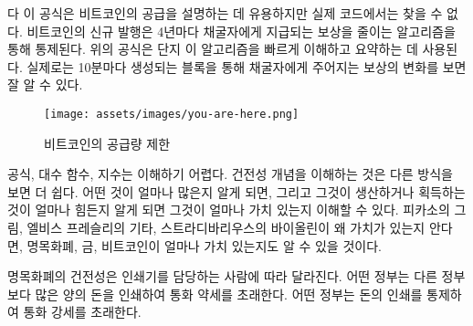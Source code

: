 \begin{comment}	
While this formula is useful to describe Bitcoin's supply, it is actually
nowhere to be found in the code. Issuance of new bitcoin is done in an
algorithmically controlled fashion, by reducing the reward which is paid to
miners every four years~\cite{btcwiki:supply}. The formula above is used to
quickly sum up what is happening under the hood. What really happens can be best
seen by looking at the change in block reward, the reward paid out to whoever
finds a valid block, which roughly happens every 10 minutes.
\end{comment}다
이 공식은 비트코인의 공급을 설명하는 데 유용하지만 실제 코드에서는 찾을 수 없다. 
비트코인의 신규 발행은  4년마다 채굴자에게 지급되는 보상을 줄이는 알고리즘을 통해 통제된다\cite{btcwiki:supply}.
위의 공식은 단지 이 알고리즘을 빠르게 이해하고 요약하는 데 사용된다. 
실제로는 10분마다 생성되는 블록을 통해 채굴자에게 주어지는 보상의 변화를 보면 잘 알 수 있다.

\begin{figure}
  \texttt{[image: assets/images/you-are-here.png]}
  \caption{비트코인의 공급량 제한}
  \label{fig:you-are-here.png}
\end{figure}

\begin{comment}	
Formulas, logarithmic functions and exponentials are not exactly
intuitive to understand. The concept of \textit{soundness} might be easier to
understand if looked at in another way. Once we know how much there is
of something, and once we know how hard this something is to produce or
get our hands on, we immediately understand its value. What is true for
Picasso's paintings, Elvis Presley's guitars, and Stradivarius violins
is also true for fiat currency, gold, and bitcoins.
\end{comment}
공식, 대수 함수, 지수는 이해하기 어렵다. 
건전성 개념을 이해하는 것은 다른 방식을 보면 더 쉽다.
어떤 것이 얼마나 많은지 알게 되면, 그리고 그것이 생산하거나 획득하는 것이 얼마나 힘든지 알게 되면 
그것이 얼마나 가치 있는지 이해할 수 있다. 
피카소의 그림, 엘비스 프레슬리의 기타, 스트라디바리우스의 바이올린이 왜 가치가 있는지 안다면,
명목화폐, 금, 비트코인이 얼마나 가치 있는지도 알 수 있을 것이다.

\begin{comment}	
The hardness of fiat currency depends on who is in charge of the
respective printing presses. Some governments might be more willing to
print large amounts of currency than others, resulting in a weaker
currency. Other governments might be more restrictive in their money
printing, resulting in harder currency.
\end{comment}
명목화폐의 건전성은 인쇄기를 담당하는 사람에 따라 달라진다. 
어떤 정부는 다른 정부보다 많은 양의 돈을 인쇄하여 통화 약세를 초래한다. 
어떤 정부는 돈의 인쇄를 통제하여 통화 강세를 초래한다.


